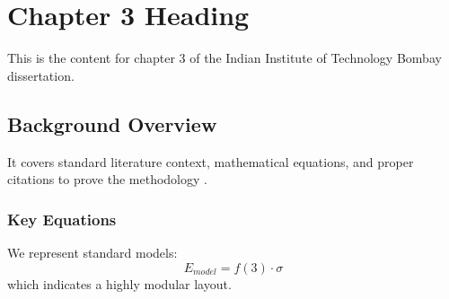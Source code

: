 \chapter{Chapter 3 Heading}
\label{ch:chapter3}
This is the content for chapter 3 of the Indian Institute of Technology Bombay dissertation.

\section{Background Overview}
It covers standard literature context, mathematical equations, and proper citations to prove the methodology \cite{texbook}.

\subsection{Key Equations}
We represent standard models:
\begin{equation}
    E_{model} = f(3) \cdot \sigma
\end{equation}
which indicates a highly modular layout.

